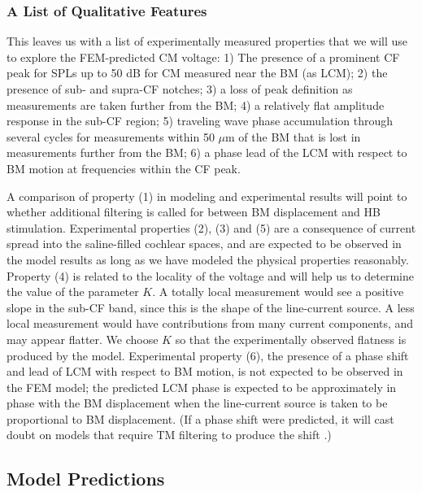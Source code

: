 \documentclass{biophys-new}
\begin{document}
\subsubsection{A List of Qualitative Features}
\par{This leaves us with a list of experimentally measured properties that we will use to explore the FEM-predicted CM voltage: 1) The presence of a prominent CF peak for SPLs up to 50 dB for CM measured near the BM (as LCM); 2) the presence of sub- and supra-CF notches; 3) a loss of peak definition as measurements are taken further from the BM; 4) a relatively flat amplitude response in the sub-CF region; 5) traveling wave phase accumulation through several cycles for measurements within 50 $\mu$m  of the BM that is lost in measurements further from the BM; 6) a phase lead of the LCM with respect to BM motion at frequencies within the CF peak.}
\par{A comparison of property (1) in modeling and experimental results will point to whether additional filtering is called for between BM displacement and HB stimulation.  Experimental properties (2), (3) and (5) are a consequence of current spread into the saline-filled cochlear spaces, and are expected to be observed in the model results as long as we have modeled the physical properties reasonably. Property (4) is related to the locality of the voltage and will help us to determine the value of the parameter $K$. A totally local measurement would see a positive slope in the sub-CF band, since this is the shape of the line-current source. A less local measurement would have contributions from many current components, and may appear flatter. We choose $K$ so that the experimentally observed flatness is produced by the model.  Experimental property (6), the presence of a phase shift and lead of LCM with respect to BM motion, is not expected to be observed in the FEM model; the predicted LCM phase is expected to be approximately in phase with the BM displacement when the line-current source is taken to be proportional to BM displacement. (If a phase shift were predicted, it will cast doubt on models that require TM filtering to produce the shift \cite{nankaliwang}.)}

\subsection{Model Predictions}
\end{document}
